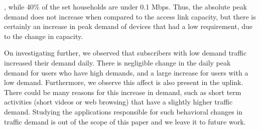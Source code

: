 , while 40\% of the \control set households 
are under 0.1 Mbps. Thus, the absolute peak demand does not increase when 
compared to the access link capacity, but there is certainly an increase in 
peak demand of devices that had a low requirement, due to the change in 
capacity.

On investigating further, we observed that subscribers with low demand traffic 
increased their demand daily. There is negligible change in the daily peak 
demand for users
who have high demands, and a large increase for users with a low demand.
Furthermore, we observe this affect is also present in the uplink.
There could be many reasons for this increase in 
demand, such as short term activities (short videos or web browsing) 
that have a slightly higher traffic demand. Studying the applications 
responsible for such behavioral changes in traffic demand is out of the
scope of this paper and we leave it to future work.